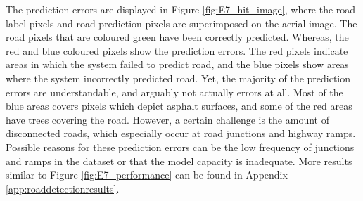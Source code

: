 The prediction errors are displayed in Figure \ref{fig:E7_hit_image}, where the road label pixels and road prediction pixels are superimposed on the aerial image. The road pixels that are coloured green have been correctly predicted. Whereas, the red and blue coloured pixels show the prediction errors. The red pixels indicate areas in which the system failed to predict road, and the blue pixels show areas where the system incorrectly predicted road. Yet, the majority of the prediction errors are understandable, and arguably not actually errors at all. Most of the blue areas covers pixels which depict asphalt surfaces, and some of the red areas have trees covering the road. However, a certain challenge is the amount of disconnected roads, which especially occur at road junctions and highway ramps. Possible reasons for these prediction errors can be the low frequency of junctions and ramps in the dataset or that the model capacity is inadequate. More results similar to Figure \ref{fig:E7_performance} can be found in Appendix \ref{app:roaddetectionresults}.\\



